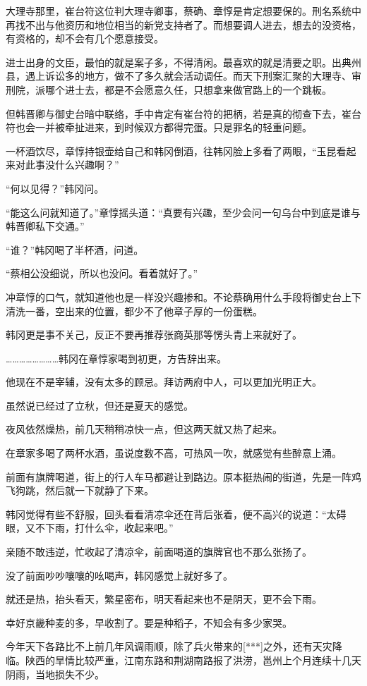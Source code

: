 大理寺那里，崔台符这位判大理寺卿事，蔡确、章惇是肯定想要保的。刑名系统中再找不出与他资历和地位相当的新党支持者了。而想要调人进去，想去的没资格，有资格的，却不会有几个愿意接受。

进士出身的文臣，最怕的就是案子多，不得清闲。最喜欢的就是清要之职。出典州县，遇上诉讼多的地方，做不了多久就会活动调任。而天下刑案汇聚的大理寺、审刑院，派哪个进士去，都是不会愿意久任，只想拿来做官路上的一个跳板。

但韩晋卿与御史台暗中联络，手中肯定有崔台符的把柄，若是真的彻查下去，崔台符也会一并被牵扯进来，到时候双方都得完蛋。只是罪名的轻重问题。

一杯酒饮尽，章惇持银壶给自己和韩冈倒酒，往韩冈脸上多看了两眼，“玉昆看起来对此事没什么兴趣啊？”

“何以见得？”韩冈问。

“能这么问就知道了。”章惇摇头道：“真要有兴趣，至少会问一句乌台中到底是谁与韩晋卿私下交通。”

“谁？”韩冈喝了半杯酒，问道。

“蔡相公没细说，所以也没问。看着就好了。”

冲章惇的口气，就知道他也是一样没兴趣掺和。不论蔡确用什么手段将御史台上下清洗一番，空出来的位置，都少不了他章子厚的一份蛋糕。

韩冈更是事不关己，反正不要再推荐张商英那等愣头青上来就好了。

……………………韩冈在章惇家喝到初更，方告辞出来。

他现在不是宰辅，没有太多的顾忌。拜访两府中人，可以更加光明正大。

虽然说已经过了立秋，但还是夏天的感觉。

夜风依然燥热，前几天稍稍凉快一点，但这两天就又热了起来。

在章家多喝了两杯水酒，虽说度数不高，可热风一吹，就感觉有些醉意上涌。

前面有旗牌喝道，街上的行人车马都避让到路边。原本挺热闹的街道，先是一阵鸡飞狗跳，然后就一下就静了下来。

韩冈觉得有些不舒服，回头看看清凉伞还在背后张着，便不高兴的说道：“太碍眼，又不下雨，打什么伞，收起来吧。”

亲随不敢违逆，忙收起了清凉伞，前面喝道的旗牌官也不那么张扬了。

没了前面吵吵嚷嚷的吆喝声，韩冈感觉上就好多了。

就还是热，抬头看天，繁星密布，明天看起来也不是阴天，更不会下雨。

幸好京畿种麦的多，早收割了。要是种稻子，不知会有多少家哭。

今年天下各路比不上前几年风调雨顺，除了兵火带来的[***]之外，还有天灾降临。陕西的旱情比较严重，江南东路和荆湖南路报了洪涝，邕州上个月连续十几天阴雨，当地损失不少。

